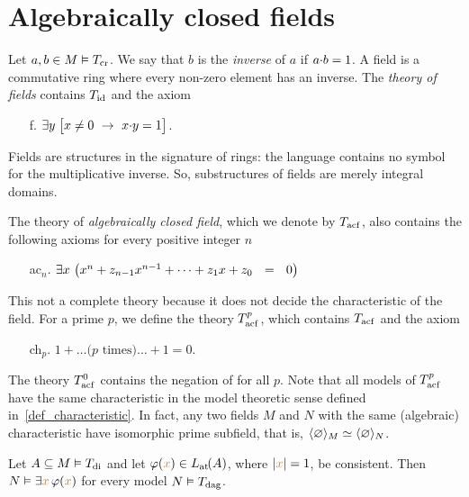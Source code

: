 \documentclass[creche.tex]{subfiles}
\begin{document}
\section{Algebraically closed fields}

Let $a,b\in M\models T_{\rm cr}$. We say that $b$ is the \emph{inverse\/} of $a$ if $a\mdot b=1$. A field is a commutative ring where every non-zero element has an inverse. The \emph{theory of fields\/} contains $T_{\rm id}$ and the axiom
\begin{itemize}
\item[f.]$\E  y\; \big[x\neq0\ \imp\ x\mdot y =1\big]$.
\end{itemize}
Fields are structures in the signature of rings: the language contains no symbol for the multiplicative inverse. So, substructures of fields are merely integral domains.

The theory of \emph{algebraically closed field}, which we denote by \emph{$T_{\rm acf}$}, also contains the following axioms for every positive integer $n$

\begin{itemize}
\item[ac$_n$.] $\E x\ \big(x^{n} + z_{n-1}x^{n-1} + \dots + z_1 x + z_0\ \ =\ \ 0\big)$
\end{itemize}

This not a complete theory because it does not decide the characteristic of the field. For a prime $p$, we define the theory \emph{$T^p_{\rm acf}$}, which contains $T_{\rm acf}$ and the axiom
\begin{itemize}
\item[ch$_p$.]$1+\dots \mbox{($p$ times)}\dots +1=0$.
\end{itemize}
The theory \emph{$T^0_{\rm acf}$\/} contains the negation of  for all $p$. Note that all models of $T^p_{\rm acf}$ have the same characteristic in the model theoretic sense defined in~\ref{def_characteristic}. In fact, any two fields $M$ and $N$ with the same (algebraic) characteristic have isomorphic prime subfield, that is, $\<\0\>_M \simeq \<\0\>_N$.

\begin{proposition}\label{prop_acf_cons_sodd}
Let $A\subseteq M\models T_{\rm di}$ and let $\phi({\mr x})\in\atL(A)$, where $|{\mr x}|=1$, be consistent. Then $N\models\E {\mr x} \,\phi({\mr x})$ for every model $N\models T_{\rm dag}$.
\end{proposition}
\end{document}

